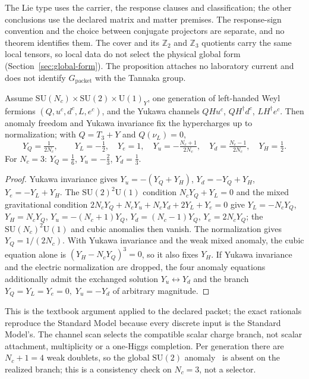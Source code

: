\documentclass[11pt]{article}
\begin{document}
The Lie type uses the carrier, the response clauses and classification; the
other conclusions use the declared matrix and matter premises. The
response-sign convention and the choice between conjugate projectors are
separate, and no theorem identifies them. The cover and its
\(\mathbb Z_2\) and \(\mathbb Z_3\) quotients carry the same local tensors, so
local data do not select the physical global form
(Section~\ref{sec:global-form}). The proposition attaches no laboratory
current and does not identify \(G_{\mathrm{packet}}\) with the Tannaka group.

\begin{theorem}
\label{thm:hypercharge}
Assume \(\mathrm{SU}(N_c)\times\mathrm{SU}(2)\times\mathrm U(1)_Y\), one
generation of left-handed Weyl fermions \((Q,u^c,d^c,L,e^c)\), and the Yukawa
channels \(QHu^c\), \(QH^\dagger d^c\), \(LH^\dagger e^c\). Then anomaly
freedom and Yukawa invariance fix the hypercharges up to normalization; with
\(Q=T_3+Y\) and \(Q(\nu_L)=0\),
\[
Y_Q=\tfrac1{2N_c},\qquad
Y_L=-\tfrac12,\quad Y_e=1,\quad
Y_u=-\tfrac{N_c+1}{2N_c},\quad Y_d=\tfrac{N_c-1}{2N_c},\quad Y_H=\tfrac12.
\]
For \(N_c=3\): \(Y_Q=\tfrac16\), \(Y_u=-\tfrac23\), \(Y_d=\tfrac13\).
\end{theorem}

\begin{proof}
Yukawa invariance gives \(Y_u=-(Y_Q+Y_H)\), \(Y_d=-Y_Q+Y_H\),
\(Y_e=-Y_L+Y_H\). The \(\mathrm{SU}(2)^2\mathrm U(1)\) condition
\(N_cY_Q+Y_L=0\) and the mixed gravitational condition
\(2N_cY_Q+N_cY_u+N_cY_d+2Y_L+Y_e=0\) give \(Y_L=-N_cY_Q\), \(Y_H=N_cY_Q\),
\(Y_u=-(N_c+1)Y_Q\), \(Y_d=(N_c-1)Y_Q\), \(Y_e=2N_cY_Q\); the
\(\mathrm{SU}(N_c)^2\mathrm U(1)\) and cubic anomalies then vanish. The
normalization gives \(Y_Q=1/(2N_c)\). With Yukawa invariance and the weak
mixed anomaly, the cubic equation alone is \((Y_H-N_cY_Q)^3=0\), so it
also fixes \(Y_H\). If Yukawa invariance and the electric normalization
are dropped, the four anomaly equations additionally admit the exchanged
solution \(Y_u\leftrightarrow Y_d\) and the branch
\(Y_Q=Y_L=Y_e=0,\;Y_u=-Y_d\) of arbitrary magnitude.
\end{proof}

This is the textbook argument applied to the declared packet; the exact
rationals reproduce the Standard Model because every discrete input is the
Standard Model's. The channel scan selects the compatible scalar charge
branch, not scalar attachment, multiplicity or a one-Higgs completion. Per
generation there are \(N_c+1=4\) weak doublets, so the global
\(\mathrm{SU}(2)\) anomaly~\cite{witten82} is absent on the realized branch;
this is a consistency check on \(N_c=3\), not a selector.
\end{document}
